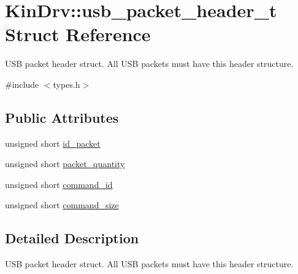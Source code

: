 \hypertarget{structKinDrv_1_1usb__packet__header__t}{\section{Kin\+Drv\+:\+:usb\+\_\+packet\+\_\+header\+\_\+t Struct Reference}
\label{structKinDrv_1_1usb__packet__header__t}
}


U\+S\+B packet header struct. All U\+S\+B packets must have this header structure.  




{\ttfamily \#include $<$types.\+h$>$}

\subsection*{Public Attributes}
\begin{DoxyCompactItemize}
\item 
unsigned short \hyperlink{structKinDrv_1_1usb__packet__header__t_a960ee443a2288035f5a8dde73156b09a}{id\+\_\+packet}
\item 
unsigned short \hyperlink{structKinDrv_1_1usb__packet__header__t_a1e7318460cae97671f9f2b2488c25e58}{packet\+\_\+quantity}
\item 
unsigned short \hyperlink{structKinDrv_1_1usb__packet__header__t_a7efa30260f38c095ba9d3496fc1f6ca3}{command\+\_\+id}
\item 
unsigned short \hyperlink{structKinDrv_1_1usb__packet__header__t_a1c5726c153fb8c111224abad09f89769}{command\+\_\+size}
\end{DoxyCompactItemize}


\subsection{Detailed Description}
U\+S\+B packet header struct. All U\+S\+B packets must have this header structure. 

